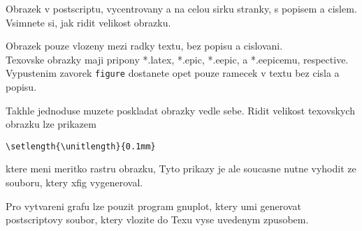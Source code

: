 Obrazek v postscriptu, vycentrovany a na celou sirku stranky, 
s popisem a cislem. Vsimnete si, jak ridit velikost obrazku.

Obrazek pouze vlozeny mezi radky textu, bez popisu a cislovani.\\

Texovske obrazky maji pripony *.latex, *.epic, *.eepic, a *.eepicemu, respective. 
% 
Vypustenim zavorek {\tt figure} dostanete opet pouze ramecek 
v textu bez cisla a popisu. 

Takhle jednoduse muzete poskladat obrazky vedle sebe.
Ridit velikost texovskych obrazku lze prikazem
\begin{verbatim}
\setlength{\unitlength}{0.1mm}
\end{verbatim}
ktere meni meritko rastru obrazku, Tyto prikazy je ale soucasne 
nutne vyhodit ze souboru, ktery xfig vygeneroval.

Pro vytvareni grafu lze pouzit program gnuplot, ktery umi generovat postscriptovy soubor, ktery vlozite
do Texu vyse uvedenym zpusobem.










